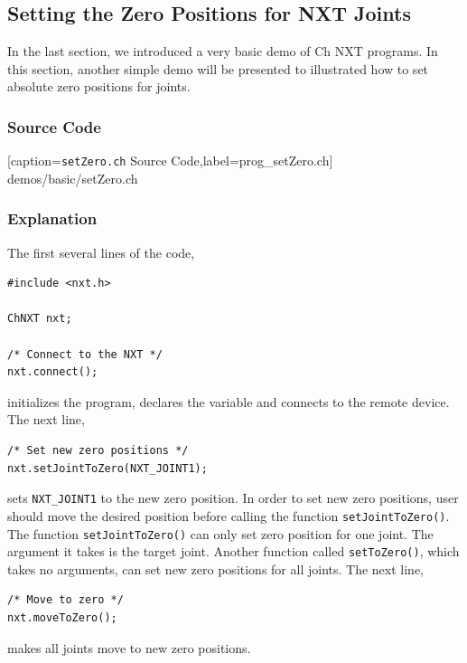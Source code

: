 \documentclass[11pt]{article}
\begin{document}
\subsection{\label{sec:setzero_demo}Setting the Zero Positions for NXT Joints}
In the last section, we introduced a very basic demo of Ch NXT programs. In this section, another simple demo
will be presented to illustrated how to set absolute zero positions for joints.

\subsubsection*{Source Code}

    [caption={{\tt setZero.ch} Source Code},label=prog_setZero.ch]
    {demos/basic/setZero.ch}

\subsubsection*{Explanation}
The first several lines of the code,\\
\begin{lstlisting}
#include <nxt.h>

ChNXT nxt;

/* Connect to the NXT */
nxt.connect();
\end{lstlisting}
initializes the program, declares the variable and connects to the remote device. The next line,
\begin{lstlisting}
/* Set new zero positions */
nxt.setJointToZero(NXT_JOINT1);
\end{lstlisting}
sets {\tt NXT\_JOINT1} to the new zero position. In order to set new zero positions, user should 
move the desired position before calling the function {\tt setJointToZero()}. The function {\tt setJointToZero()} 
can only set zero position for one joint. The argument it takes is the target joint. Another function called 
{\tt setToZero()}, which takes no arguments, can set new zero positions for all joints. The next line,
\begin{lstlisting}
/* Move to zero */
nxt.moveToZero();
\end{lstlisting}
makes all joints move to new zero positions.

\end{document}
